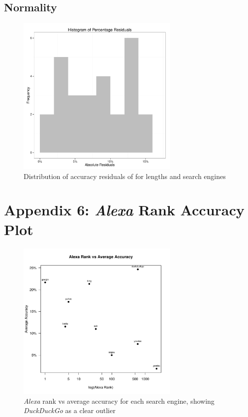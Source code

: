 \documentclass{csfourzero}
\begin{document}
\subsection{Normality}
\begin{figure}[H]
  \centerline{\includegraphics[width=0.7\textwidth]{residual_histogram}}
  \caption{Distribution of accuracy residuals of for lengths and search engines}\label{fig:9searchengines}
\end{figure}

\pagebreak
\section{Appendix 6: \textit{Alexa} Rank Accuracy Plot}
\begin{figure}[H]
  \centerline{\includegraphics[width=0.7\textwidth]{rank_scatter}}
  \caption{\textit{Alexa} rank vs average accuracy for each search engine, showing \textit{DuckDuckGo} as a clear outlier}\label{fig:9searchengines}
\end{figure}
\end{document}
